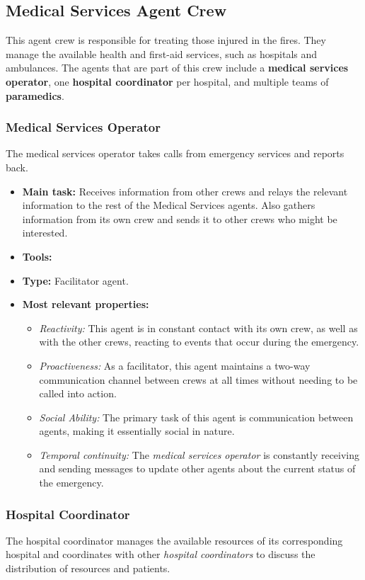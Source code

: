 \subsection{Medical Services Agent Crew}
This agent crew is responsible for treating those injured in the fires. 
They manage the available health and first-aid services, such as hospitals and ambulances. 
The agents that are part of this crew include a \textbf{medical services operator}, one \textbf{hospital coordinator} per hospital, and multiple teams of \textbf{paramedics}.

\subsubsection{Medical Services Operator}
The medical services operator takes calls from emergency services and reports back.

\begin{itemize}
    \item \textbf{Main task:} Receives information from other crews and relays the relevant information to the rest of the Medical Services agents. Also gathers information from its own crew and sends it to other crews who might be interested.
    \item \textbf{Tools:}
    \item \textbf{Type:} Facilitator agent.
    \item \textbf{Most relevant properties:}
    \begin{itemize}
        \item \textit{Reactivity:} This agent is in constant contact with its own crew, as well as with the other crews, reacting to events that occur during the emergency.
        \item \textit{Proactiveness:} As a facilitator, this agent maintains a two-way communication channel between crews at all times without needing to be called into action.
        \item \textit{Social Ability:} The primary task of this agent is communication between agents, making it essentially social in nature.
        \item \textit{Temporal continuity:} The \textit{medical services operator} is constantly receiving and sending messages to update other agents about the current status of the emergency.
    \end{itemize}
\end{itemize}

\subsubsection{Hospital Coordinator}
The hospital coordinator manages the available resources of its corresponding hospital and coordinates with other \textit{hospital coordinators} to discuss the distribution of resources and patients.


